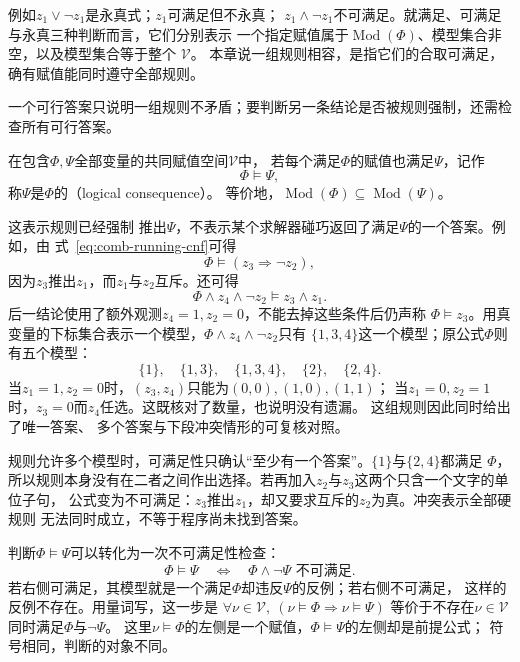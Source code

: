 例如$z_1\lor\neg z_1$是永真式；$z_1$可满足但不永真；
$z_1\land\neg z_1$不可满足。就满足、可满足与永真三种判断而言，它们分别表示
一个指定赋值属于$\operatorname{Mod}(\Phi)$、模型集合非空，以及模型集合等于整个
$\mathcal{V}$。
本章说一组规则相容，是指它们的合取可满足，确有赋值能同时遵守全部规则。

一个可行答案只说明一组规则不矛盾；要判断另一条结论是否被规则强制，还需检查所有可行答案。
\begin{definition}[逻辑后承]
\label{def:comb-logical-consequence}
在包含$\Phi,\Psi$全部变量的共同赋值空间$\mathcal{V}$中，
若每个满足$\Phi$的赋值也满足$\Psi$，记作
\[
  \Phi\models\Psi,
\]
称$\Psi$是$\Phi$的（logical consequence）。
等价地，$\operatorname{Mod}(\Phi)\subseteq\operatorname{Mod}(\Psi)$。
\end{definition}
这表示规则已经强制
推出$\Psi$，不表示某个求解器碰巧返回了满足$\Psi$的一个答案。例如，由
式~\eqref{eq:comb-running-cnf}可得
\[
  \Phi\models(z_3\Rightarrow\neg z_2),
\]
因为$z_3$推出$z_1$，而$z_1$与$z_2$互斥。还可得
\[
  \Phi\land z_4\land\neg z_2
  \models z_3\land z_1.
\]
后一结论使用了额外观测$z_4=1,z_2=0$，不能去掉这些条件后仍声称
$\Phi\models z_3$。用真变量的下标集合表示一个模型，$\Phi\land z_4\land\neg z_2$只有
$\{1,3,4\}$这一个模型；原公式$\Phi$则有五个模型：
\[
  \{1\},\quad\{1,3\},\quad\{1,3,4\},\quad\{2\},\quad\{2,4\}.
\]
当$z_1=1,z_2=0$时，$(z_3,z_4)$只能为$(0,0),(1,0),(1,1)$；
当$z_1=0,z_2=1$时，$z_3=0$而$z_4$任选。这既核对了数量，也说明没有遗漏。
这组规则因此同时给出了唯一答案、
多个答案与下段冲突情形的可复核对照。

规则允许多个模型时，可满足性只确认“至少有一个答案”。$\{1\}$与$\{2,4\}$都满足
$\Phi$，所以规则本身没有在二者之间作出选择。若再加入$z_2$与$z_3$这两个只含一个文字的单位子句，
公式变为不可满足：$z_3$推出$z_1$，却又要求互斥的$z_2$为真。冲突表示全部硬规则
无法同时成立，不等于程序尚未找到答案。

判断$\Phi\models\Psi$可以转化为一次不可满足性检查：
\begin{equation}
  \Phi\models\Psi
  \quad\Longleftrightarrow\quad
  \Phi\land\neg\Psi\text{ 不可满足}.
  \label{eq:comb-entailment-unsat}
\end{equation}
若右侧可满足，其模型就是一个满足$\Phi$却违反$\Psi$的反例；若右侧不可满足，
这样的反例不存在。用量词写，这一步是
$\forall\nu\in\mathcal{V},\ (\nu\models\Phi\Rightarrow\nu\models\Psi)$
等价于不存在$\nu\in\mathcal{V}$同时满足$\Phi$与$\neg\Psi$。
这里$\nu\models\Phi$的左侧是一个赋值，$\Phi\models\Psi$的左侧却是前提公式；
符号相同，判断的对象不同。

